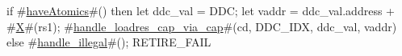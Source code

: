 if #\hyperref[sailRISCVzhaveAtomics]{haveAtomics}#() then {
  let ddc_val = DDC;
  let vaddr = ddc_val.address + #\hyperref[sailRISCVzX]{X}#(rs1);
  #\hyperref[sailRISCVzhandlezyloadreszycapzyviazycap]{handle\_loadres\_cap\_via\_cap}#(cd, DDC_IDX, ddc_val, vaddr)
} else {
  #\hyperref[sailRISCVzhandlezyillegal]{handle\_illegal}#();
  RETIRE_FAIL
}
